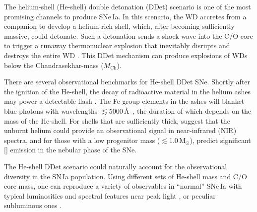 \documentclass[twocolumn]{aastex631}
\newcommand{\Mch}{$M_\mathrm{Ch}$}
\newcommand{\Msun}{\mathrm{M_\odot}}
\begin{document}
The helium-shell (He-shell) double detonation (DDet) scenario is one of the most promising channels to produce SNe\,Ia. In this scenario, the WD accretes from a companion to develop a helium-rich shell, which, after becoming sufficiently massive, could detonate. Such a detonation sends a shock wave into the C/O core to trigger a runaway thermonuclear explosion that inevitably disrupts and destroys the entire WD \citep{Nomoto_1982a, Nomoto_1982b, Woosley_1986, Livne_1990, Woosley_1994, Livne_1995}. This DDet mechanism can produce explosions of WDs below the Chandrasekhar-mass (\Mch).

There are several observational benchmarks for He-shell DDet SNe. Shortly after the ignition of the He-shell, the decay of radioactive material in the helium ashes may power a detectable flash \citep{Woosley_1994,Fink_DD_2010,Kromer_DD_2010}. The Fe-group elements in the ashes will blanket blue photons with wavelengths $\lesssim$5000\,\AA\ \citep{Kromer_DD_2010}, the duration of which depends on the mass of the He-shell. For shells that are sufficiently thick, \citet{Boyle2017_Helium} suggest that the unburnt helium could provide an observational signal in near-infrared (NIR) spectra, and for those with a low progenitor mass ($\lesssim$1.0\,$\Msun$), \citet{polin_nebular_2021} predict significant [] emission in the nebular phase of the SNe.

The He-shell DDet scenario could naturally account for the observational diversity in the SN\,Ia population. Using different sets of He-shell mass and C/O core mass, one can reproduce a variety of observables in ``normal'' SNe\,Ia with typical luminosities and spectral features near peak light \citep[e.g.,][]{Townsley_2019,Shen_2D_2021,Magee_2021}, or peculiar subluminous ones \citep[e.g.,][]{polin_observational_2019}. 
\end{document}
